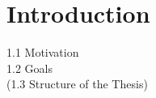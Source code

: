 \chapter{Introduction}
\label{cha:Introduction}

1.1 Motivation\\
1.2 Goals\\
(1.3 Structure of the Thesis)